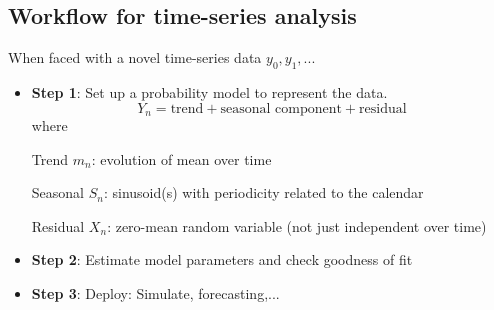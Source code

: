 \documentclass[12pt]{article}
\begin{document}
\subsection{Workflow for time-series analysis}
When faced with a novel time-series data $y_0,y_1,...$
\begin{itemize}
    \item \textbf{\textcolor{blue1}{Step 1}}: Set up a probability model to represent the data. 
    \[
    Y_n = \textrm{trend} + \textrm{seasonal component} + \textrm{residual}
    \]
    where 
    \begin{center}
        Trend $m_n$: evolution of mean over time 
        
        Seasonal $S_n$: sinusoid(s) with periodicity related to the calendar
        
        Residual $X_n$: zero-mean random variable (not just independent over time)
    \end{center}
    \item \textbf{\textcolor{blue1}{Step 2}}: Estimate model parameters and check goodness of fit
    \item \textbf{\textcolor{blue1}{Step 3}}: Deploy: Simulate, forecasting,...
\end{itemize}
\end{document}
